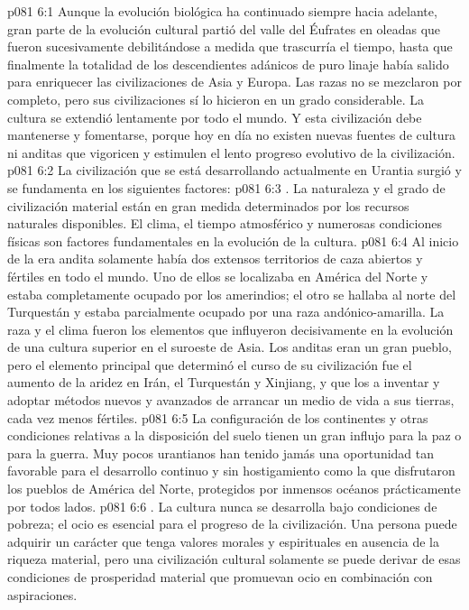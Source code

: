 \vs p081 6:1 Aunque la evolución biológica ha continuado siempre hacia adelante, gran parte de la evolución cultural partió del valle del Éufrates en oleadas que fueron sucesivamente debilitándose a medida que trascurría el tiempo, hasta que finalmente la totalidad de los descendientes adánicos de puro linaje había salido para enriquecer las civilizaciones de Asia y Europa. Las razas no se mezclaron por completo, pero sus civilizaciones sí lo hicieron en un grado considerable. La cultura se extendió lentamente por todo el mundo. Y esta civilización debe mantenerse y fomentarse, porque hoy en día no existen nuevas fuentes de cultura ni anditas que vigoricen y estimulen el lento progreso evolutivo de la civilización.
\vs p081 6:2 \pc La civilización que se está desarrollando actualmente en Urantia surgió y se fundamenta en los siguientes factores:
\vs p081 6:3 . La naturaleza y el grado de civilización material están en gran medida determinados por los recursos naturales disponibles. El clima, el tiempo atmosférico y numerosas condiciones físicas son factores fundamentales en la evolución de la cultura.
\vs p081 6:4 Al inicio de la era andita solamente había dos extensos territorios de caza abiertos y fértiles en todo el mundo. Uno de ellos se localizaba en América del Norte y estaba completamente ocupado por los amerindios; el otro se hallaba al norte del Turquestán y estaba parcialmente ocupado por una raza andónico\hyp{}amarilla. La raza y el clima fueron los elementos que influyeron decisivamente en la evolución de una cultura superior en el suroeste de Asia. Los anditas eran un gran pueblo, pero el elemento principal que determinó el curso de su civilización fue el aumento de la aridez en Irán, el Turquestán y Xinjiang, y que los  a inventar y adoptar métodos nuevos y avanzados de arrancar un medio de vida a sus tierras, cada vez menos fértiles.
\vs p081 6:5 La configuración de los continentes y otras condiciones relativas a la disposición del suelo tienen un gran influjo para la paz o para la guerra. Muy pocos urantianos han tenido jamás una oportunidad tan favorable para el desarrollo continuo y sin hostigamiento como la que disfrutaron los pueblos de América del Norte, protegidos por inmensos océanos prácticamente por todos lados.
\vs p081 6:6 . La cultura nunca se desarrolla bajo condiciones de pobreza; el ocio es esencial para el progreso de la civilización. Una persona puede adquirir un carácter que tenga valores morales y espirituales en ausencia de la riqueza material, pero una civilización cultural solamente se puede derivar de esas condiciones de prosperidad material que promuevan ocio en combinación con aspiraciones.
